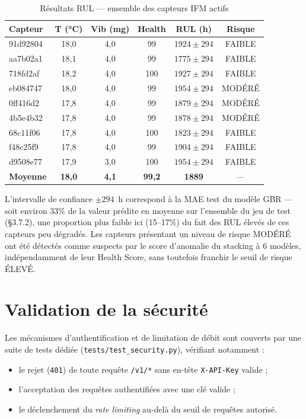 \documentclass[12pt,a4paper]{report}
\begin{document}
\begin{table}[H]
\centering
\caption{Résultats RUL — ensemble des capteurs IFM actifs}
\label{tab:rul_capteurs}
\begin{tabular}{lccccc}
\toprule
\textbf{Capteur} & \textbf{T (°C)} & \textbf{Vib (mg)} & \textbf{Health} & \textbf{RUL (h)} & \textbf{Risque} \\
\midrule
91d92804 & 18,0 & 4,0 & 99 & $1924 \pm 294$ & FAIBLE \\
aa7b02a1 & 18,1 & 4,0 & 99 & $1775 \pm 294$ & FAIBLE \\
718fd2af & 18,2 & 4,0 & 100 & $1927 \pm 294$ & FAIBLE \\
eb084747 & 18,0 & 4,0 & 99 & $1954 \pm 294$ & MODÉRÉ \\
0ff416d2 & 17,8 & 4,0 & 99 & $1879 \pm 294$ & MODÉRÉ \\
4b5e4b32 & 17,8 & 4,0 & 99 & $1878 \pm 294$ & MODÉRÉ \\
68c11f06 & 17,8 & 4,0 & 100 & $1823 \pm 294$ & FAIBLE \\
f48c25f9 & 17,8 & 4,0 & 99 & $1904 \pm 294$ & FAIBLE \\
d9508e77 & 17,9 & 3,0 & 100 & $1954 \pm 294$ & FAIBLE \\
\textbf{Moyenne} & \textbf{18,0} & \textbf{4,1} & \textbf{99,2} & \textbf{1889} & — \\
\bottomrule
\end{tabular}
\end{table}

\noindent L'intervalle de confiance $\pm 294$~h correspond à la MAE test du modèle GBR —
soit environ 33\% de la valeur prédite en moyenne sur l'ensemble du jeu de test (\S3.7.2),
une proportion plus faible ici (15--17\%) du fait des RUL élevés de ces capteurs peu dégradés.
Les capteurs présentant un niveau de risque MODÉRÉ ont été détectés comme suspects par le
score d'anomalie du stacking à 6 modèles, indépendamment de leur Health Score, sans
toutefois franchir le seuil de risque ÉLEVÉ.

\section{Validation de la sécurité}

Les mécanismes d'authentification et de limitation de débit sont couverts par une suite
de tests dédiée (\texttt{tests/test\_security.py}), vérifiant notamment :

\begin{itemize}
  \item le rejet (\texttt{401}) de toute requête \texttt{/v1/*} sans en-tête \texttt{X-API-Key} valide ;
  \item l'acceptation des requêtes authentifiées avec une clé valide ;
  \item le déclenchement du \textit{rate limiting} au-delà du seuil de requêtes autorisé.
\end{itemize}
\end{document}
